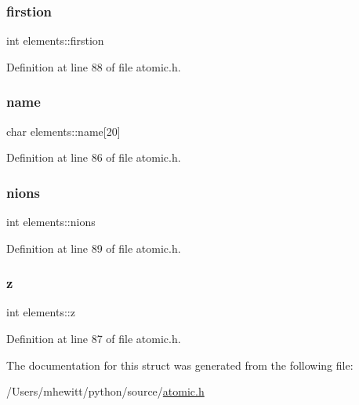 \subsubsection{\texorpdfstring{firstion}{firstion}}
{\footnotesize\ttfamily int elements\+::firstion}



Definition at line 88 of file atomic.\+h.

\mbox{\label{structelements_ac6a5e682babab0bc79f63d6395f3837e}} 
\subsubsection{\texorpdfstring{name}{name}}
{\footnotesize\ttfamily char elements\+::name\mbox{[}20\mbox{]}}



Definition at line 86 of file atomic.\+h.

\mbox{\label{structelements_a90866d4e99cc142553839ad5e8f13dbc}} 
\subsubsection{\texorpdfstring{nions}{nions}}
{\footnotesize\ttfamily int elements\+::nions}



Definition at line 89 of file atomic.\+h.

\mbox{\label{structelements_aae9cca99fda4810bda33b861f9fbd70b}} 
\subsubsection{\texorpdfstring{z}{z}}
{\footnotesize\ttfamily int elements\+::z}



Definition at line 87 of file atomic.\+h.



The documentation for this struct was generated from the following file\+:\begin{DoxyCompactItemize}
\item 
/\+Users/mhewitt/python/source/\hyperlink{atomic_8h}{atomic.\+h}\end{DoxyCompactItemize}
